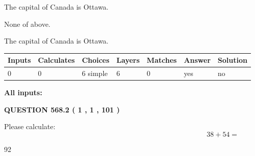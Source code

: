 \documentclass[12pt]{article}
\begin{document}
 
The capital of Canada is Ottawa.
 
 
 None of above.
 
 
\noindent{}
 
 
The capital of Canada is Ottawa.
 
 
\noindent{}
 
 
   
   
   
   
\noindent\begin{tabular}{|l|l|l|l|l|l|l|}
 \hline
Inputs & Calculates & Choices & Layers & Matches & Answer & Solution \\ \hline
 0  & 
 0  & 
 6
  simple  
  & 
 6  & 
 0  & 
  yes & 
  no 
  \\ \hline
 \end{tabular}
   
   
   
   
\noindent{}
   
   
   
   
\noindent\vspace{0.1in}\hspace{-0.08in} {\textbf{\Large{All inputs: }}}
   
   
  
\vspace{0.2in}
  
{\textbf{\Large{QUESTION
568.2 
 ( 1 , 1 , 101 )
}}}
  
  
 
Please calculate:
\begin{equation}
38 +  %
54 = \nonumber
\end{equation}
 
 
 
\noindent{}
 
 

92
 
 
\noindent{}
 
 

 
 
 
\noindent{}
 
\end{document}
